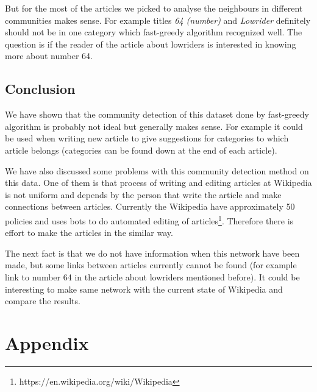 \documentclass[paper=a4, fontsize=11pt]{scrartcl} %
\begin{document}
But for the most of the articles we picked to analyse the neighbours in different communities makes sense. For example titles \textit{64 (number)} and \textit{Lowrider} definitely should not be in one category which fast-greedy algorithm recognized well. The question is if the reader of the article about lowriders is interested in knowing more about number 64. 

\subsection{Conclusion}
We have shown that the community detection of this dataset done by fast-greedy algorithm is probably not ideal but generally makes sense. For example it could be used when writing new article to give suggestions for categories to which article belongs (categories can be found down at the end of each article).

We have also discussed some problems with this community detection method on this data. One of them is that process of writing and editing articles at Wikipedia is not uniform and depends by the person that write the article and make connections between articles. Currently the Wikipedia have approximately 50 policies and uses bots to do automated editing of articles\footnote{https://en.wikipedia.org/wiki/Wikipedia}. Therefore there is effort to make the articles in the similar way.

The next fact is that we do not have information when this network have been made, but some links between articles currently cannot be found (for example link to number 64 in the article about lowriders mentioned before). It could be interesting to make same network with the current state of Wikipedia and compare the results.

\section{Appendix}
\end{document}
